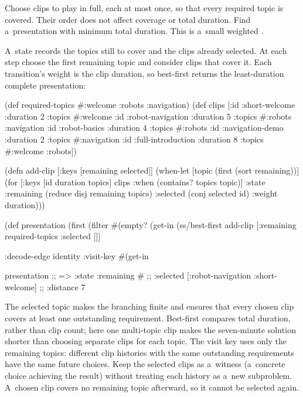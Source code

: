 {{Choose clips to play in full, each at most once, so that every required
topic is covered. Their order does not affect coverage or total duration.
Find a~presentation with minimum total duration. This is a~small weighted
.

\smallskip
{} A~state records the topics still to cover and the
clips already selected. At each step choose the first remaining topic and
consider clips that cover it. Each transition's weight is the clip duration,
so best-first returns the least-duration complete presentation:

\begtt {}
(def required-topics #{:welcome :robots :navigation})
(def clips
  [{:id :short-welcome :duration 2 :topics #{:welcome}}
   {:id :robot-navigation :duration 5 :topics #{:robots :navigation}}
   {:id :robot-basics :duration 4 :topics #{:robots}}
   {:id :navigation-demo :duration 2 :topics #{:navigation}}
   {:id :full-introduction :duration 8 :topics #{:welcome :robots}}])

(defn add-clip [{:keys [remaining selected]}]
  (when-let [topic (first (sort remaining))]
    (for [{:keys [id duration topics]} clips
          :when (contains? topics topic)]
      {:state {:remaining (reduce disj remaining topics)
               :selected (conj selected id)}
       :weight duration})))

(def presentation
  (first (filter #(empty? (get-in %
                 (ss/best-first
                  add-clip
                  [{:remaining required-topics :selected []}]
                  {:decode-edge identity
                   :visit-key #(get-in %

presentation
;; => {:state {:remaining #{}
;;             :selected [:robot-navigation :short-welcome]}
;;     :distance 7}
\endtt

The selected topic makes the branching finite and ensures that every chosen
clip covers at least one outstanding requirement. Best-first compares total
duration, rather than clip count; here one multi-topic clip makes the
seven-minute solution shorter than choosing separate clips for each topic.
The visit key uses only the remaining topics: different clip histories
with the same outstanding requirements have the same future choices.
Keep the selected clips as a~witness (a~concrete choice achieving the result)
without treating each history as a~new subproblem.
A~chosen clip covers no remaining topic afterward, so it cannot
be selected again.

}}}
